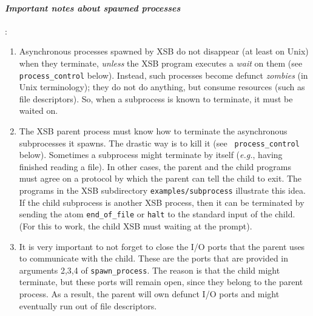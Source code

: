 \paragraph{\em Important notes about spawned processes\/}:
\begin{enumerate}
\item Asynchronous processes spawned by XSB do not disappear (at least on
  Unix) when they terminate, \emph{unless} the XSB program executes a
  \emph{wait} on them (see {\tt process\_control} below). Instead, such
  processes become defunct \emph{zombies} (in Unix terminology); they do
  not do anything, but consume resources (such as file descriptors). So,
  when a subprocess is known to terminate, it must be waited on.
  
\item The XSB parent process must know how to terminate the asynchronous
  subprocesses it spawns. The drastic way is to kill it (see {\tt
    process\_control} below). Sometimes a subprocess might terminate by
  itself ({\it e.g.}, having finished reading a file). In other cases, the
  parent and the child programs must agree on a protocol by which the
  parent can tell the child to exit. The programs in the XSB subdirectory
  {\tt examples/subprocess} illustrate this idea. If the child subprocess
  is another XSB process, then it can be terminated by sending the atom
  {\tt end\_of\_file} or {\tt halt} to the standard input of the child.
  (For this to work, the child XSB must waiting at the prompt).
\item It is very important to not forget to close the I/O ports that the
  parent uses to communicate with the child. These are the ports that are
  provided in arguments 2,3,4 of {\tt spawn\_process}. The reason
  is that the child might terminate, but these ports will remain open,
  since they belong to the parent process. As a result, the parent will own
  defunct I/O ports and might eventually run out of file descriptors.
\end{enumerate}

